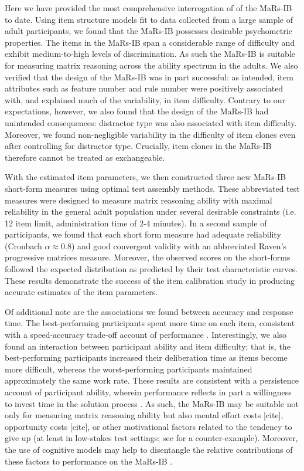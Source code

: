 \documentclass[a4paper,man,natbib]{apa6}
\begin{document}
Here we have provided the most comprehensive interrogation of of the MaRs-IB to date. Using item structure models fit to data collected from a large sample of adult participants, we found that the MaRs-IB possesses desirable psychometric properties. The items in the MaRs-IB span a considerable range of difficulty and exhibit medium-to-high levels of discrimination. As such the MaRs-IB is suitable for measuring matrix reasoning across the ability spectrum in the adults. We also verified that the design of the MaRs-IB was in part successful: as intended, item attributes such as feature number and rule number were positively associated with, and explained much of the variability, in item difficulty. Contrary to our expectations, however, we also found that the design of the MaRs-IB had unintended consequences: distractor type was also associated with item difficulty. Moreover, we found non-negligible variability in the difficulty of item clones even after controlling for distractor type. Crucially, item clones in the MaRs-IB therefore cannot be treated as exchangeable. 

With the estimated item parameters, we then constructed three new MaRs-IB short-form measures using optimal test assembly methods. These abbreviated test measures were designed to measure matrix reasoning ability with maximal reliability in the general adult population under several desirable constraints (i.e. 12 item limit, administration time of 2-4 minutes). In a second sample of participants, we found that each short form measure had adequate reliability (Cronbach $\alpha \approx 0.8$) and good convergent validity with an abbreviated Raven's progressive matrices measure. Moreover, the observed scores on the short-forms followed the expected distribution as predicted by their test characteristic curves. These results demonstrate the success of the item calibration study in producing accurate estimates of the item parameters. 

Of additional note are the associations we found between accuracy and response time. The best-performing participants spent more time on each item, consistent with a speed-accuracy trade-off account of performance \citep{heitz2014speed}. Interestingly, we also found an interaction between participant ability and item difficulty; that is, the best-performing participants increased their deliberation time as items become more difficult, whereas the worst-performing participants maintained approximately the same work rate. These results are consistent with a persistence account of participant ability, wherein performance reflects in part a willingness to invest time in the solution process \citep{ranger2021effects}. As such, the MaRs-IB may be suitable not only for measuring matrix reasoning ability but also mental effort costs [cite], opportunity costs [cite], or other  motivational factors \citep{duckworth2011role} related to the tendency to give up (at least in low-stakes test settings; see \cite{shaw2020reasoning} for a counter-example). Moreover, the use of cognitive models may help to disentangle the relative contributions of these factors to performance on the MaRs-IB \citep{ranger2014accumulator}.
\end{document}
